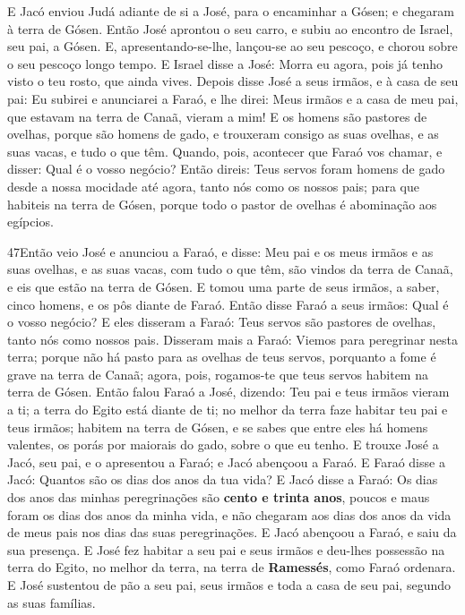 E Jacó enviou Judá adiante de si a José, para o encaminhar a
Gósen; e chegaram à terra de Gósen. Então José aprontou o seu
carro, e subiu ao encontro de Israel, seu pai, a Gósen. E,
apresentando-se-lhe, lançou-se ao seu pescoço, e chorou sobre o seu
pescoço longo tempo. E Israel disse a José: Morra eu agora,
pois já tenho visto o teu rosto, que ainda vives. Depois
disse José a seus irmãos, e à casa de seu pai: Eu subirei e
anunciarei a Faraó, e lhe direi: Meus irmãos e a casa de meu pai,
que estavam na terra de Canaã, vieram a mim! E os homens são
pastores de ovelhas, porque são homens de gado, e trouxeram consigo
as suas ovelhas, e as suas vacas, e tudo o que têm. Quando,
pois, acontecer que Faraó vos chamar, e disser: Qual é o vosso
negócio? Então direis: Teus servos foram homens de gado desde
a nossa mocidade até agora, tanto nós como os nossos pais; para que
habiteis na terra de Gósen, porque todo o pastor de ovelhas é
abominação aos egípcios.

\smallskip

\lettrine{47} Então veio José e anunciou a Faraó, e disse: Meu
pai e os meus irmãos e as suas ovelhas, e as suas vacas, com tudo o
que têm, são vindos da terra de Canaã, e eis que estão na terra de
Gósen. E tomou uma parte de seus irmãos, a saber, cinco homens,
e os pôs diante de Faraó. Então disse Faraó a seus irmãos: Qual
é o vosso negócio? E eles disseram a Faraó: Teus servos são pastores
de ovelhas, tanto nós como nossos pais. Disseram mais a Faraó:
Viemos para peregrinar nesta terra; porque não há pasto para as
ovelhas de teus servos, porquanto a fome é grave na terra de Canaã;
agora, pois, rogamos-te que teus servos habitem na terra de Gósen.
Então falou Faraó a José, dizendo: Teu pai e teus irmãos vieram
a ti; a terra do Egito está diante de ti; no melhor da terra
faze habitar teu pai e teus irmãos; habitem na terra de Gósen, e se
sabes que entre eles há homens valentes, os porás por maiorais do
gado, sobre o que eu tenho. E trouxe José a Jacó, seu pai, e o
apresentou a Faraó; e Jacó abençoou a Faraó. E Faraó disse a
Jacó: Quantos são os dias dos anos da tua vida? E Jacó disse a
Faraó: Os dias dos anos das minhas peregrinações são \textbf{cento e
trinta anos}, poucos e maus foram os dias dos anos da minha vida, e
não chegaram aos dias dos anos da vida de meus pais nos dias das
suas peregrinações. E Jacó abençoou a Faraó, e saiu da sua
presença. E José fez habitar a seu pai e seus irmãos e
deu-lhes possessão na terra do Egito, no melhor da terra, na terra
de \textbf{Ramessés}, como Faraó ordenara. E José sustentou
de pão a seu pai, seus irmãos e toda a casa de seu pai, segundo as
suas famílias.


